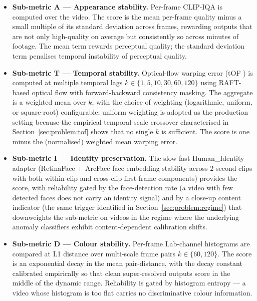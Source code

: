 \begin{itemize}
    \item \textbf{Sub-metric A --- Appearance stability.} Per-frame CLIP-IQA
          \cite{wang_clipiqa_2023} is computed over the video. The score is the mean
          per-frame quality minus a small multiple of its standard deviation across frames,
          rewarding outputs that are not only high-quality on average but consistently so
          across minutes of footage. The mean term rewards perceptual quality; the standard
          deviation term penalises temporal instability of perceptual quality.

    \item \textbf{Sub-metric T --- Temporal stability.} Optical-flow warping error (tOF
          \cite{chu_tecogan_2020}) is computed at multiple temporal lags
          $k \in \{1, 5, 10, 30, 60, 120\}$ using RAFT-based optical flow with
          forward-backward consistency masking. The aggregate is a weighted mean over $k$,
          with the choice of weighting (logarithmic, uniform, or square-root) configurable;
          uniform weighting is adopted as the production setting because the empirical
          temporal-scale crossover characterised in Section~\ref{sec:problem:tof} shows
          that no single $k$ is sufficient. The score is one minus the (normalised)
          weighted mean warping error.

    \item \textbf{Sub-metric I --- Identity preservation.} The slow-fast Human\_Identity
          adapter (RetinaFace + ArcFace face embedding stability across $2$-second clips
          with both within-clip and cross-clip first-frame components) provides the score,
          with reliability gated by the face-detection rate (a video with few detected
          faces does not carry an identity signal) and by a close-up content indicator
          (the same trigger identified in Section~\ref{sec:problem:regime}) that
          downweights the sub-metric on videos in the regime where the underlying anomaly
          classifiers exhibit content-dependent calibration shifts.

    \item \textbf{Sub-metric D --- Colour stability.} Per-frame Lab-channel histograms are
          compared at L1 distance over multi-scale frame pairs $k \in \{60, 120\}$. The
          score is an exponential decay in the mean pair-distance, with the decay constant
          calibrated empirically so that clean super-resolved outputs score in the middle
          of the dynamic range. Reliability is gated by histogram entropy --- a video
          whose histogram is too flat carries no discriminative colour information.


\end{itemize}
